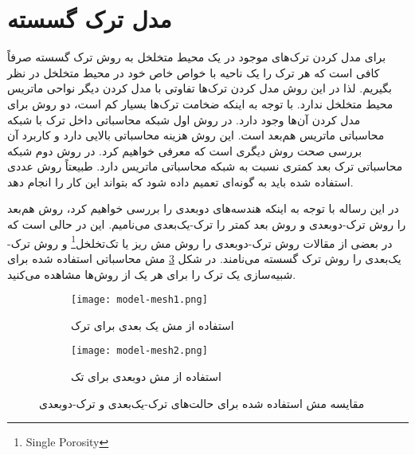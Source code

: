 \section{مدل ترک گسسته}
برای مدل کردن ترک‌های موجود در یک محیط متخلخل به روش ترک گسسته صرفاً کافی است که هر ترک را یک ناحیه با خواص خاص خود در محیط متخلخل در نظر بگیریم. لذا در این روش مدل کردن ترک‌ها تفاوتی با مدل کردن دیگر نواحی ماتریس محیط متخلخل ندارد. با توجه به اینکه ضخامت ترک‌ها بسیار کم است، دو روش برای مدل کردن آن‌ها وجود دارد. در روش اول شبکه محاسباتی داخل ترک با شبکه محاسباتی ماتریس هم‌بعد است. این روش هزینه محاسباتی بالایی دارد و کاربرد آن بررسی صحت روش دیگری است که معرفی خواهیم کرد. در روش دوم شبکه محاسباتی ترک بعد کمتری نسبت به شبکه محاسباتی ماتریس دارد. طبیعتاً روش عددی استفاده شده باید به گونه‌ای تعمیم داده شود که بتواند این کار را انجام دهد.

در این رساله با توجه به اینکه هند‌سه‌های دوبعدی را بررسی خواهیم کرد، روش هم‌بعد را روش ترک-دوبعدی و روش بعد کمتر را ترک-یک‌بعدی می‌نامیم. این در حالی است که در بعضی از مقالات روش ترک-دوبعدی را روش مش ریز\cite{karimi2} یا تک‌تخلخل\footnote{Single Porosity}\cite{karimi1} و روش ترک-یک‌بعدی را روش ترک گسسته می‌نامند. در شکل \ref{fig:2f} مش محاسباتی استفاده شده برای شبیه‌سازی یک ترک را برای هر یک از روش‌ها مشاهده می‌کنید.
\begin{figure}
\begin{subfigure}{0.5\textwidth}
\texttt{[image: model-mesh1.png]} 
\caption{استفاده از مش یک بعدی برای ترک}
\label{fig:2f-1}
\end{subfigure}
\begin{subfigure}{0.5\textwidth}
\texttt{[image: model-mesh2.png]} 
\caption{استفاده از مش دوبعدی برای تک}
\label{fig:2f-2}
\end{subfigure}

\caption{مقایسه مش استفاده شده برای حالت‌های ترک-یک‌بعدی و ترک-دوبعدی}
\label{fig:2f}
\end{figure}
